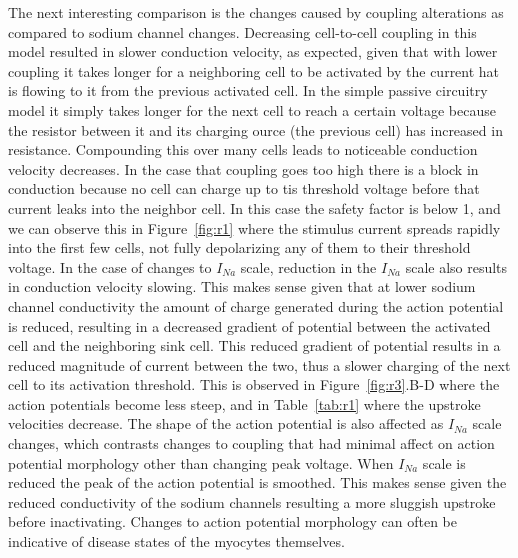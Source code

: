 \documentclass[12pt]{article}
\begin{document}
The next interesting comparison is the changes caused by coupling alterations as compared to sodium channel changes. Decreasing cell-to-cell coupling in this model resulted in slower conduction velocity, as expected, given that with lower coupling it takes longer for a neighboring cell to be activated by the current hat is flowing to it from the previous activated cell. In the simple passive circuitry model it simply takes longer for the next cell to reach a certain voltage because the resistor between it and its charging ource (the previous cell) has increased in resistance. Compounding this over many cells leads to noticeable conduction velocity decreases. In the case that coupling goes too high there is a block in conduction because no cell can charge up to tis threshold voltage before that current leaks into the neighbor cell. In this case the safety factor is below 1, and we can observe this in Figure~\ref{fig:r1} where the stimulus current spreads rapidly into the first few cells, not fully depolarizing any of them to their threshold voltage. In the case of changes to $I_{Na}$ scale, reduction in the $I_{Na}$ scale also results in conduction velocity slowing. This makes sense given that  at lower sodium channel conductivity the amount of charge generated during the action potential is reduced, resulting in a decreased gradient of potential between the activated cell and the neighboring sink cell. This reduced gradient of potential results in a reduced magnitude of current between the two, thus a slower charging of the next cell to its activation threshold. This is observed in Figure~\ref{fig:r3}.B-D where the action potentials become less steep, and in Table~\ref{tab:r1} where the upstroke velocities decrease. The shape of the action potential is also affected as $I_{Na}$ scale changes, which contrasts changes to coupling that had minimal affect on action potential morphology other than changing peak voltage. When $I_{Na}$ scale is reduced the peak of the action potential is smoothed. This makes sense given the reduced conductivity of the sodium channels resulting a more sluggish upstroke before inactivating. Changes to action potential morphology can often be indicative of disease states of the myocytes themselves.
\end{document}
